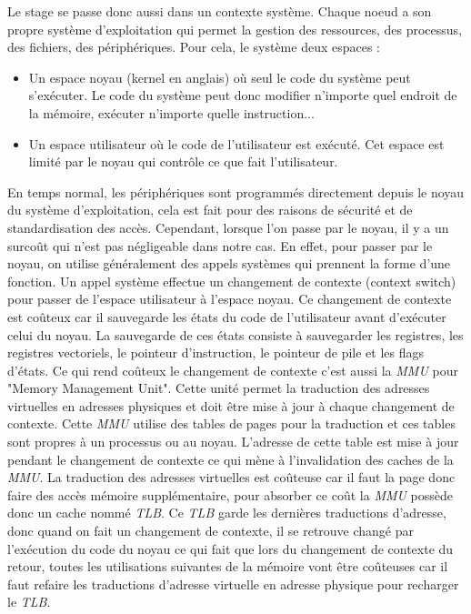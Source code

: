 Le stage se passe donc aussi dans un contexte système.
Chaque noeud a son propre système d'exploitation qui permet la gestion des ressources, des processus, des fichiers, des périphériques.
Pour cela, le système deux espaces :
\begin{itemize}
  \item Un espace noyau (kernel en anglais) où seul le code du système peut s'exécuter.
  Le code du système peut donc modifier n'importe quel endroit de la mémoire, exécuter n'importe quelle instruction...
  \item Un espace utilisateur où le code de l'utilisateur est exécuté.
  Cet espace est limité par le noyau qui contrôle ce que fait l'utilisateur.
\end{itemize}

En temps normal, les périphériques sont programmés directement depuis le noyau du système d'exploitation, cela est fait pour des raisons de sécurité et de standardisation des accès.
Cependant, lorsque l'on passe par le noyau, il y a un surcoût qui n'est pas négligeable dans notre cas.
En effet, pour passer par le noyau, on utilise généralement des appels systèmes qui prennent la forme d'une fonction.
Un appel système effectue un changement de contexte (context switch) pour passer de l'espace utilisateur à l'espace noyau.
Ce changement de contexte est coûteux car il sauvegarde les états du code de l'utilisateur avant d'exécuter celui du noyau.
La sauvegarde de ces états consiste à sauvegarder les registres, les registres vectoriels, le pointeur d'instruction, le pointeur de pile et les flags d'états.
Ce qui rend coûteux le changement de contexte c'est aussi la \emph{MMU} pour "Memory Management Unit".
Cette unité permet la traduction des adresses virtuelles en adresses physiques et doit être mise à jour à chaque changement de contexte.
Cette \emph{MMU} utilise des tables de pages pour la traduction et ces tables sont propres à un processus ou au noyau.
L'adresse de cette table est mise à jour pendant le changement de contexte ce qui mène à l'invalidation des caches de la \emph{MMU}.
La traduction des adresses virtuelles est coûteuse car il faut la page donc faire des accès mémoire supplémentaire,
pour absorber ce coût la \emph{MMU} possède donc un cache nommé \emph{TLB}.
Ce \emph{TLB} garde les dernières traductions d'adresse, donc quand on fait un changement de contexte, il se retrouve changé par l'exécution du code du noyau ce qui fait que lors du changement de contexte du retour,
toutes les utilisations suivantes de la mémoire vont être coûteuses car il faut refaire les traductions d'adresse virtuelle en adresse physique pour recharger le \emph{TLB}.

